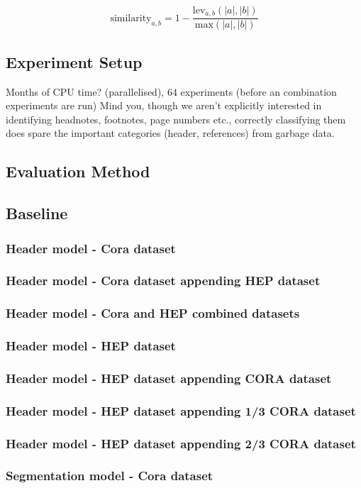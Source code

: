 \documentclass[10pt, oneside]{scrartcl}   	%
\begin{document}
$$\text{similarity}_{a, b} =1 - \frac{\text{lev}_{a, b}(|a|, |b|)}{\text{max}(|a|, |b|)}$$

\subsection{Experiment Setup}
Months of CPU time? (parallelised), 64 experiments (before an combination experiments are run)
Mind you, though we aren't explicitly interested in identifying headnotes, footnotes, page numbers etc., correctly classifying them does spare the important categories (header, references) from garbage data.
\subsection{Evaluation Method}
\subsection{Baseline}
\subsubsection{Header model - Cora dataset}
\subsubsection{Header model - Cora dataset appending HEP dataset}
\subsubsection{Header model - Cora and HEP combined datasets}
\subsubsection{Header model - HEP dataset}
\subsubsection{Header model - HEP dataset appending CORA dataset}
\subsubsection{Header model - HEP dataset appending 1/3 CORA dataset}
\subsubsection{Header model - HEP dataset appending 2/3 CORA dataset}
\subsubsection{Segmentation model - Cora dataset}
\end{document}
